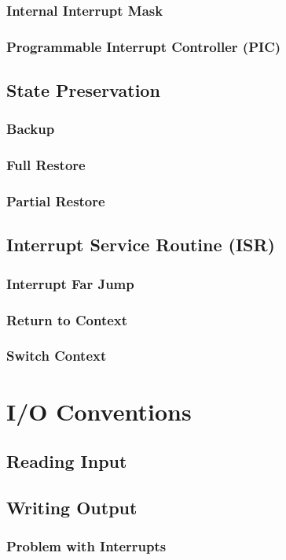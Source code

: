 \documentclass[oneside, a4paper]{memoir}
\begin{document}
\subsection{Internal Interrupt Mask}
\subsection{Programmable Interrupt Controller (PIC)}
\section{State Preservation}
\label{sec:State Preservation}
\subsection{Backup}
\subsection{Full Restore}
\subsection{Partial Restore}
\section{Interrupt Service Routine (ISR)}
\subsection{Interrupt Far Jump}
\subsection{Return to Context}
\subsection{Switch Context}

\chapter{I/O Conventions}
\section{Reading Input}
\section{Writing Output}
\subsection{Problem with Interrupts}
\end{document}
